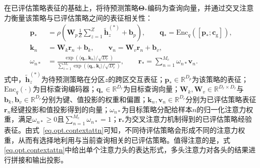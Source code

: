 在已评估策略表征的基础上，将待预测策略$\bm{\Theta}_{*}$编码为查询向量，并通过交叉注意力衡量该策略与已评估策略之间的表征相关性：
\begin{equation}
\begin{aligned}
\bm{p}_{*}
&=\rho\left(
\bm{W}_{p}\frac{1}{Z}\sum_{z=1}^{Z}\widetilde{\bm{h}}_{z}^{(*)}
+\bm{b}_{p}
\right),\qquad
\bm{q}_{*}
=\mathrm{Enc}_{q}\left(
\left[\bm{p}_{*};\bm{c}_{\mathrm{g}}\right]
\right),\\
\bm{k}_{n}
&=\bm{W}_{k}\bm{r}_{n}+\bm{b}_{k},\qquad
\bm{v}_{n}
=\bm{W}_{v}\bm{r}_{n}+\bm{b}_{v},\\
\omega_{n*}
&=
\frac{
\exp\left(\langle\bm{q}_{*},\bm{k}_{n}\rangle/\sqrt{D_r}\right)}
{\displaystyle
\sum_{i=1}^{M_c}
\exp\left(\langle\bm{q}_{*},\bm{k}_{i}\rangle/\sqrt{D_r}\right)},
\qquad
\bm{r}_{*}
=\sum_{n=1}^{M_c}\omega_{n*}\bm{v}_{n}.
\end{aligned}
\label{eq.opt.contextattn}
\end{equation}
式中，$\widetilde{\bm{h}}_{z}^{(*)}$为待预测策略在分区$z$的跨区交互表征；$\bm{p}_{*}\in\mathbb{R}^{D_p}$为该策略的表征；$\mathrm{Enc}_{q}(\cdot)$为目标查询编码器；$\bm{q}_{*}\in\mathbb{R}^{D_r}$为目标查询向量；$\bm{W}_{k},\bm{W}_{v}\in\mathbb{R}^{D_r\times D_r}$与$\bm{b}_{k},\bm{b}_{v}\in\mathbb{R}^{D_r}$分别为键、值投影的权重和偏置；$\bm{k}_{n},\bm{v}_{n}\in\mathbb{R}^{D_r}$分别为已评估策略表征$\bm{r}_{n}$经键投影和值投影得到的向量；$\omega_{n*}$为目标策略分配给样本$n$的归一化注意力权重，满足$\omega_{n*}\geq0$且$\sum_{n=1}^{M_c}\omega_{n*}=1$；$\bm{r}_{*}$为交叉注意力机制得到的已评估策略经验表征。由式~\eqref{eq.opt.contextattn}可知，不同待评估策略会形成不同的注意力权重，从而有选择地利用与当前查询相关的已评估策略。值得注意的是，式 \eqref{eq.opt.contextattn}中给出单个注意力头的表达形式，多头注意力对各头的结果进行拼接和输出投影。

